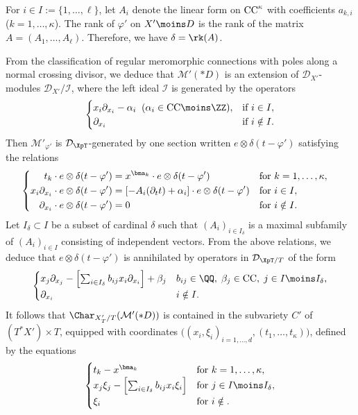 \documentclass{amsart}
\theoremstyle{plain}
\numberwithin{theorem}{section}
\theoremstyle{definition}
\theoremstyle{remark}
\theoremstyle{definition}
\newcommand{\cD}{\mathcal{D}}
\newcommand{\cI}{\mathcal{I}}
\newcommand{\cM}{\mathcal{M}}
\newcommand{\CC}{\textup{CC}}
\begin{document}
For $i\in I:=\{1,\dots,\ell\}$, let $A_i$ denote the linear form on $\CC^\kappa$ with coefficients $a_{k,i}$ (\hbox{$k=1,\dots,\kappa$}). The rank of $\varphi'$ on $X'\moins D$ is the rank of the matrix $A=(A_1,\dots,A_\ell)$. Therefore, we have $\delta=\rk(A)$.

From the classification of regular meromorphic connections with poles along a normal crossing divisor, we deduce that $\cM'(*D)$ is an extension of $\cD_{X'}$-modules $\cD_{X'}/\cI$, where the left ideal $\cI$ is generated by the operators
\begin{equation}\label{eq:presentationMprime}
\begin{cases}
x_i\partial_{x_i}-\alpha_i\;\;(\alpha_i\in\CC\moins\ZZ),&\text{if }i\in I,\\
\partial_{x_i}&\text{if }i\notin I.
\end{cases}
\end{equation}
Then $\cM'_{\varphi'}$ is $\cD_{\XpT}$-generated by one section written $e\otimes\delta(t-\varphi')$ satisfying the relations
\[
\begin{cases}
\begin{aligned}
t_k\cdot e\otimes\delta(t-\varphi')&=x^{\bma_k}\cdot e\otimes\delta(t-\varphi')&&\text{for }k=1,\dots,\kappa,\\
x_i\partial_{x_i}\cdot e\otimes\delta(t-\varphi')&=[-A_i(\partial_tt)+\alpha_i]\cdot e\otimes\delta(t-\varphi')&&\text{for }i\in I,\\
\partial_{x_i}\cdot e\otimes\delta(t-\varphi')&=0&&\text{for }i\notin I.
\end{aligned}
\end{cases}
\]
Let $I_\delta\subset I$ be a subset of cardinal $\delta$ such that $(A_i)_{i\in I_\delta}$ is a maximal subfamily of $(A_i)_{i\in I}$ consisting of independent vectors. From the above relations, we deduce that $e\otimes\delta(t-\varphi')$ is annihilated by operators in $\cD_{\XpT/T}$ of the form
\begin{equation}\label{eq:operators}
\begin{cases}
x_j\partial_{x_j}-\Bigl[\sum_{i\in I_\delta}b_{ij}x_i\partial_{x_i}\Bigr]+\beta_j&b_{ij}\in\QQ,\;\beta_j\in\CC,\;j\in I\moins I_\delta,\\
\partial_{x_i}&i\notin I.
\end{cases}
\end{equation}
It follows that $\Char_{X'_T/T}(\cM'(*D))$ is contained in the subvariety $C'$ of $(T^*X')\times T$, equipped with coordinates $\bigl((x_i,\xi_i)_{i=1,\dots,d},(t_1,\dots,t_\kappa)\bigr)$, defined by the equations
\[
\begin{cases}
t_k-x^{\bma_k}&\text{for }k=1,\dots,\kappa,\\
x_j\xi_j-\Bigl[\sum_{i\in I_\delta}b_{ij}x_i\xi_i\Bigr]&\text{for }j\in  I\moins I_\delta,\\
\xi_i&\text{for }i\notin.
\end{cases}
\]
\end{document}
